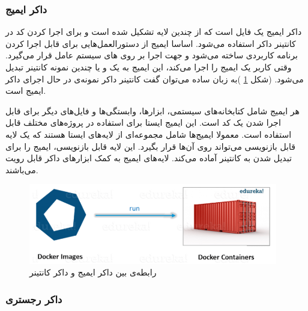 \subsubsection*{داکر ایمیج}
داکر ایمیج  یک فایل است که از چندین لایه تشکیل شده است و برای اجرا کردن کد در کانتینر داکر استفاده می‌شود. اساسا ایمیج از دستورالعمل‌هایی برای قابل اجرا کردن برنامه کاربردی ساخته می‌شود و جهت اجرا بر روی 
های سیستم عامل قرار می‌گیرد. وقتی کاربر یک ایمیج را اجرا می‌کند، این ایمیج به یک و یا چندین نمونه کانتینر تبدیل می‌شود. (شکل
\ref{تصویر 2-6}
)به زبان ساده می‌توان گفت کانتینر داکر نمونه‌ی در حال اجرای داکر ایمیج است.

هر ایمیج شامل کتابخانه‌های سیستمی، ابزارها، وابستگی‌ها و فایل‌های دیگر برای قابل اجرا شدن یک کد است. این ایمیج ایستا برای استفاده در پروژه‌های مختلف قابل استفاده است. معمولا ایمیج‌ها شامل مجموعه‌ای از لایه‌های ایستا هستند که یک لایه قابل بازنویسی می‌تواند روی آن‌‌ها قرار بگیرد. این لایه قابل بازنویسی، ایمیج را برای تبدیل شدن به کانتینر آماده می‌کند. لایه‌های ایمیج به کمک ابزارهای داکر قابل رویت می‌باشند.

\begin{figure}[!h]
	\centering
	\includegraphics[height=3.5cm]{fig2-6}
	\caption{رابطه‌ی بین داکر ایمیج و داکر کانتینر}
	\label{تصویر 2-6}
\end{figure}


\subsubsection*{داکر رجستری}

